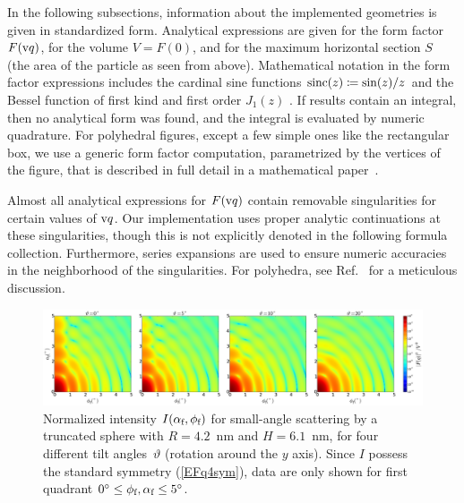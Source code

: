 
In the following subsections,
information about the implemented geometries is given in standardized form.
Analytical expressions are given for the form factor $F(\text{v}{q})$,
for the volume $V=F(0)$,
and for the maximum horizontal section $S$
(the area of the particle as seen from above).
%
Mathematical notation in the form factor expressions includes
the cardinal sine functions $\operatorname{sinc}(z)\coloneqq\sin(z)/z$
and the Bessel function of first kind and first order $J_1(z)$
\cite[Ch.~9]{AbSt64}.
%
If results contain an integral,
then no analytical form was found,
and the integral is evaluated by numeric quadrature.
%
For polyhedral figures,
except a few simple ones like the rectangular box,
we use a generic form factor computation,
parametrized by the vertices of the figure,
that is described in full detail in a mathematical paper~\cite{ba:ffp}.

Almost all analytical expressions for $F(\text{v}{q})$ contain
removable singularities for certain values of $\text{v}{q}$.
Our implementation uses proper analytic continuations at these singularities,
though this is not explicitly denoted in the following formula collection.
Furthermore, series expansions are used to ensure numeric accuracies
in the neighborhood of the singularities.
For polyhedra, see Ref.~\cite{ba:ffp} for a meticulous discussion.

\begin{figure}[t]
\begin{center}
\includegraphics[width=\textwidth]{fig/ff2/ff_demo_1quadrants.pdf}
\end{center}
\caption{Normalized intensity $I(\alpha_{\text{f}},\phi_{\text{f}})$
for small-angle scattering by a truncated sphere with $R=4.2$~nm and $H=6.1$~nm,
for four different tilt angles~$\vartheta$ (rotation around the $y$ axis).
Since $I$ possess the standard symmetry (\protect\ref{EFq4sym}),
data are only shown for first quadrant $0^\circ\le\phi_{\text{f}},\alpha_{\text{f}}\le 5^\circ$.}
\label{F1quadrants}
\end{figure}

